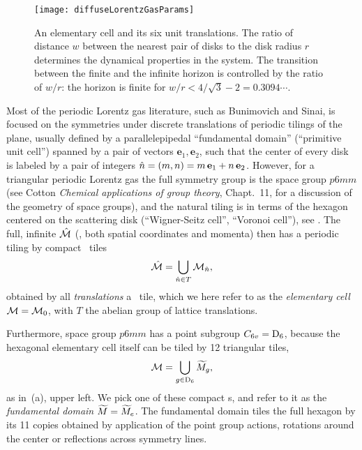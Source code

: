 

\begin{figure}[htbp]
	\begin{center}
    \texttt{[image: diffuseLorentzGasParams]}
	\end{center}
	\caption[]{\label{fig-LorentzGasParams}
    An elementary cell and its six unit translations. The ratio of
    distance $w$ between the nearest pair of disks to the disk radius $r$
    determines the dynamical properties in the system. The transition
    between the finite and the infinite horizon is controlled by the
    ratio of $w/r$: the horizon is finite for $w/r < 4/\sqrt{3}-2
    =0.3094\cdots$.
	}
\end{figure}

Most of the periodic Lorentz gas literature, such as Bunimovich and
Sinai, is focused on the symmetries under discrete
translations of periodic tilings of the plane, usually defined by a
parallelepipedal ``fundamental domain'' (``primitive unit cell'')
spanned by a pair of vectors
$\textbf{e}_1,\textbf{e}_2$, such that the center of every disk is
labeled by a pair of integers
$\hat{n}=(m,n)=m\,\textbf{e}_1+n\,\textbf{e}_2$.
However, for a triangular periodic Lorentz gas the full symmetry group is
the space group $p6mm$ (see Cotton {\em Chemical
applications of group theory},  Chapt.~11, for a discussion of the
geometry of space groups), and the natural tiling is in terms of the
hexagon centered on the scattering disk (``Wigner-Seitz cell'', ``Voronoi
cell''),  see .
The full, infinite {\statesp} $\hat {{\cal M}}$ (\ie, both spatial coordinates and
momenta) then has a periodic tiling by compact \statesp\ tiles
\[ %
\hM=\bigcup_{ \hn \in T} \pS_{\hn},
\] %
obtained by all {\em translations} a \statesp\ tile, which we here refer
to as the {\em elementary cell} ${\cal M}={\cal M}_{0}$, with $T$ the abelian group
of lattice translations.

Furthermore, space group $p6mm$ has a point subgroup $C_{6v}=\textrm{D}_{6}$,
because the hexagonal elementary cell itself can be tiled by 12
triangular tiles,
\[ %
\pS=\bigcup_{\LieEl \in \Dn{6}} \tM_\LieEl,
\] %
as in \,(a), upper left. We pick one of these
compact \statesp s, and refer to it as the
\emph{fundamental domain} ${\widetilde M}={\widetilde M}_e$. The fundamental domain tiles the
full hexagon by its 11 copies obtained by application of the  point
group actions, rotations around the center or reflections across symmetry
lines.

